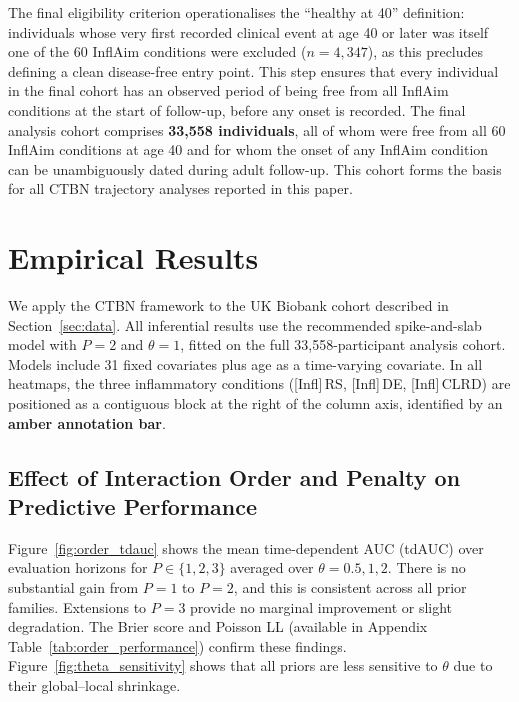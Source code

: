 \documentclass[12pt]{article}
\begin{document}
The final eligibility criterion operationalises the ``healthy at 40'' definition: individuals whose very first recorded clinical event at age 40 or later was itself one of the 60 InflAim conditions were excluded ($n = 4{,}347$), as this precludes defining a clean disease-free entry point. This step ensures that every individual in the final cohort has an observed period of being free from all InflAim conditions at the start of follow-up, before any onset is recorded. The final analysis cohort comprises \textbf{33,558 individuals}, all of whom were free from all 60 InflAim conditions at age 40 and for whom the onset of any InflAim condition can be unambiguously dated during adult follow-up. This cohort forms the basis for all CTBN trajectory analyses reported in this paper.


\section{Empirical Results}
\label{sec:empirical}

We apply the CTBN framework to the UK Biobank cohort described in
Section~\ref{sec:data}.  All inferential results use the recommended spike-and-slab model with $P = 2$ and $\theta = 1$, fitted on the full 33,558-participant analysis cohort.  Models include 31 fixed covariates plus age as a time-varying covariate.  In all heatmaps, the three inflammatory conditions ([Infl]\,RS, [Infl]\,DE, [Infl]\,CLRD) are positioned as a contiguous block at the right of the column axis, identified by an \textbf{amber annotation bar}.

\subsection{Effect of Interaction Order and Penalty on Predictive Performance}

Figure~\ref{fig:order_tdauc} shows the mean time-dependent AUC (tdAUC) over evaluation horizons for $P \in \{1, 2, 3\}$ averaged over $\theta = 0.5, 1, 2$.  There is no substantial gain from $P = 1$ to $P = 2$, and this is consistent across all prior families. Extensions to $P = 3$ provide no marginal improvement or slight degradation.  The Brier score and Poisson LL (available in Appendix Table~\ref{tab:order_performance}) confirm
these findings. Figure~\ref{fig:theta_sensitivity} shows that all priors are less sensitive to $\theta$ due to their global--local shrinkage. 
\end{document}
